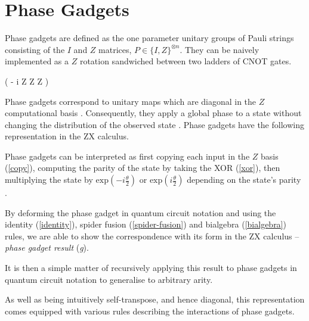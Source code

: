 \section{Phase Gadgets}
Phase gadgets are defined as the one parameter unitary groups of Pauli strings consisting of the $I$ and $Z$ matrices, $P \in \{I, Z\}^{\otimes n}$. They can be naively implemented as a $Z$ rotation sandwiched between two ladders of CNOT gates.

{ \left( - i  Z \otimes Z \otimes Z \right)}

Phase gadgets correspond to unitary maps which are diagonal in the $Z$ computational basis \cite{Cowtan2020}. Consequently, they apply a global phase to a state without changing the distribution of the observed state \cite{Yeung2020}. Phase gadgets have the following representation in the ZX calculus.


Phase gadgets can be interpreted as first copying each input in the $Z$ basis (\ref{copy}), computing the parity of the state by taking the XOR (\ref{xor}), then multiplying the state by $\text{exp} \left(-i\frac{\theta}{2} \right)$ or $\text{exp} \left(i\frac{\theta}{2} \right)$ depending on the state's parity \cite{Yeung2020}.

By deforming the phase gadget in quantum circuit notation and using the identity (\ref{identity}), spider fusion (\ref{spider-fusion}) and bialgebra (\ref{bialgebra}) rules, we are able to show the correspondence with its form in the ZX calculus -- \textit{phase gadget result} (\textit{g}).


It is then a simple matter of recursively applying this result to phase gadgets in quantum circuit notation to generalise to arbitrary arity.

%
\label{phase-gadget-proof}

As well as being intuitively self-transpose, and hence diagonal, this representation comes equipped with various rules describing the interactions of phase gadgets. 

